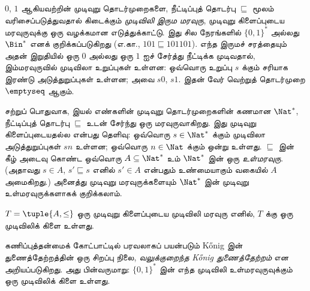 \documentclass[../../../include/open-logic-section]{subfiles}
\begin{document}
\begin{ex}
$0$, $1$ ஆகியவற்றின் முடிவுறு தொடர்முறைகளை, நீட்டிப்புத் தொடர்பு
$\sqsubseteq$ மூலம் வரிசைப்படுத்துவதால் கிடைக்கும்
\emph{முடிவிலி இரும மரவுரு}, முடிவுறு கிளைப்புடைய மரவுருவுக்கு
ஒரு வழக்கமான எடுத்துக்காட்டு. இது சில நேரங்களில் $\{0,1\}^*$ அல்லது
$\Bin^*$ எனக் குறிக்கப்படுகிறது (எ.கா., $101 \sqsubseteq 101101$).
எந்த இருமச் சரத்தையும் அதன் இறுதியில் ஒரு $0$ அல்லது ஒரு $1$ ஐச்
சேர்த்து நீட்டிக்க முடிவதால், இம்மரவுருவில் முடிவிலா உறுப்புகள் உள்ளன:
ஒவ்வொரு உறுப்பு $s$ க்கும் சரியாக இரண்டு அடுத்துறுப்புகள் உள்ளன;
அவை $s0$, $s1$. இதன் வேர் வெற்றுத் தொடர்முறை $\emptyseq$ ஆகும்.
\end{ex}

\begin{ex}
சற்றுப் பொதுவாக, இயல் எண்களின் முடிவுறு தொடர்முறைகளின் கணமான
$\Nat^*$, நீட்டிப்புத் தொடர்பு $\sqsubseteq$ உடன் சேர்ந்து ஒரு
மரவுருவாகிறது. இது முடிவுறு கிளைப்புடையதல்ல என்பது தெளிவு:
ஒவ்வொரு $s \in \Nat^*$ க்கும் முடிவிலா அடுத்துறுப்புகள் $sn$ உள்ளன;
ஒவ்வொரு $n \in \Nat$ க்கும் ஒன்று உள்ளது.
$\sqsubseteq$ இன் கீழ் அடைவு கொண்ட ஒவ்வொரு $A
\subseteq \Nat^*$ உம் $\Nat^*$ இன் ஒரு \emph{உள்மரவுரு}.
(அதாவது $s \in A$, $s' \sqsubseteq s$ எனில் $s' \in A$
என்பதும் உண்மையாகும் வகையில் $A$ அமைகிறது.)
அனைத்து முடிவுறு மரவுருக்களையும் $\Nat^*$ இன் முடிவுறு உள்மரவுருக்களாகக்
குறிக்கலாம்.
\end{ex}

\begin{prop}[K\H{o}nig இன் துணைத்தேற்றம்]
$T = \tuple{A,\le}$ ஒரு முடிவுறு கிளைப்புடைய முடிவிலி மரவுரு எனில்,
$T$ க்கு ஒரு முடிவிலிக் கிளை உள்ளது.
\end{prop}

கணிப்புத்தன்மைக் கோட்பாட்டில் பரவலாகப் பயன்படும் K\H{o}nig இன்
துணைத்தேற்றத்தின் ஒரு சிறப்பு நிலை,
\emph{வலுக்குறைந்த K\H{o}nig துணைத்தேற்றம்} என அறியப்படுகிறது.
அது பின்வருமாறு: $\{0,1\}^*$ இன் எந்த முடிவிலி உள்மரவுருவுக்கும்
ஒரு முடிவிலிக் கிளை உள்ளது.
\end{document}
